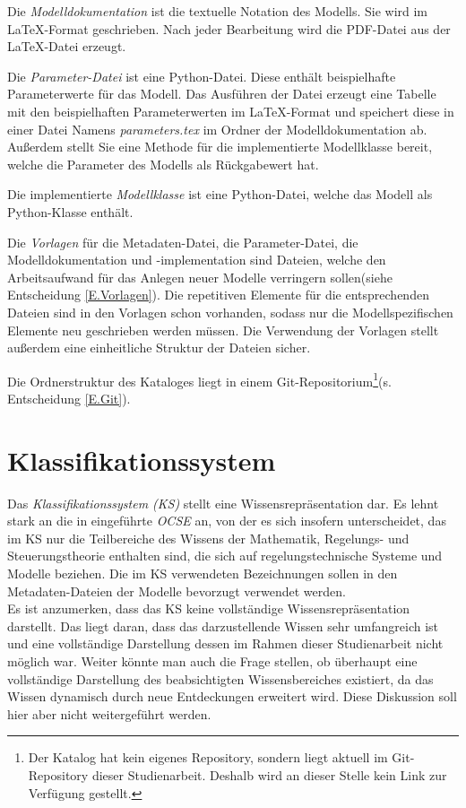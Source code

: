 Die \textit{Modelldokumentation} ist die textuelle Notation des Modells. Sie wird im \LaTeX-Format geschrieben. Nach jeder Bearbeitung wird die PDF-Datei aus der \LaTeX-Datei erzeugt. 

Die \textit{Parameter-Datei} ist eine Python-Datei. Diese enthält beispielhafte Parameterwerte für das Modell. Das Ausführen der Datei erzeugt eine Tabelle mit den beispielhaften Parameterwerten im \LaTeX-Format und speichert diese in einer Datei Namens \textit{parameters.tex} im Ordner der Modelldokumentation ab. Außerdem stellt Sie eine Methode für die implementierte Modellklasse bereit, welche die Parameter des Modells als Rückgabewert hat.

Die implementierte \textit{Modellklasse} ist eine Python-Datei, welche das Modell als Python-Klasse enthält. 

Die \textit{Vorlagen} für die Metadaten-Datei, die Parameter-Datei, die Modelldokumentation und -implementation sind Dateien, welche den Arbeitsaufwand für das Anlegen neuer Modelle verringern sollen(siehe Entscheidung \ref{E.Vorlagen}). Die repetitiven Elemente für die entsprechenden Dateien sind in den Vorlagen schon vorhanden, sodass nur die Modellspezifischen Elemente neu geschrieben werden müssen. Die Verwendung der Vorlagen stellt außerdem eine einheitliche Struktur der Dateien sicher.

Die Ordnerstruktur des Kataloges liegt in einem Git-Repositorium\footnote{Der Katalog hat kein eigenes Repository, sondern liegt aktuell im Git-Repository dieser Studienarbeit. Deshalb wird an dieser Stelle kein Link zur Verfügung gestellt.}(s. Entscheidung \ref{E.Git}).  

\section{Klassifikationssystem}
\label{Ch:Ergebnisse:Sec:KS}
Das \textit{Klassifikationssystem (KS)} stellt eine Wissensrepräsentation dar. Es lehnt stark an die in \cite{KNHE20a} eingeführte \textit{OCSE} an, von der es sich insofern unterscheidet, das im KS nur die Teilbereiche des Wissens der Mathematik, Regelungs- und Steuerungstheorie enthalten sind, die sich auf regelungstechnische Systeme und Modelle beziehen. Die im KS verwendeten Bezeichnungen sollen in den Metadaten-Dateien der Modelle bevorzugt verwendet werden. \\
Es ist anzumerken, dass das KS keine vollständige Wissensrepräsentation darstellt. Das liegt daran, dass das darzustellende Wissen sehr umfangreich ist und eine vollständige Darstellung dessen im Rahmen dieser Studienarbeit nicht möglich war. Weiter könnte man auch die Frage stellen, ob überhaupt eine vollständige Darstellung des beabsichtigten Wissensbereiches existiert, da das Wissen dynamisch durch neue Entdeckungen erweitert wird. Diese Diskussion soll hier aber nicht weitergeführt werden. 

